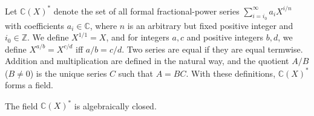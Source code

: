 Let $\mathbb{C}(X)^*$ denote the set of all formal fractional-power series $\sum_{i=i_0}^{\infty} a_i X^{i/n}$ with coefficients $a_i \in \mathbb{C}$, where $n$ is an arbitrary but fixed positive integer and $i_0 \in \mathbb{Z}$. We define $X^{1/1} = X$, and for integers $a, c$ and positive integers $b, d$, we define $X^{a/b} = X^{c/d}$ iff $a/b = c/d$. Two series are equal if they are equal termwise. Addition and multiplication are defined in the natural way, and the quotient $A/B$ ($B \neq 0$) is the unique series $C$ such that $A = BC$. With these definitions, $\mathbb{C}(X)^*$ forms a field.

The field $\mathbb{C}(X)^*$ is algebraically closed.
